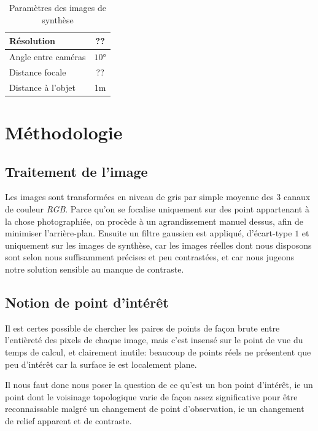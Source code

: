 \documentclass[
	a4paper, %
	10pt, %
	unnumberedsections, %
	twoside, %
]{LTJournalArticle}
\begin{document}
\begin{table}[t]
	\begin{adjustbox}{width=\columnwidth, left}
		\begin{tabular}{l c}
			\hline
			Résolution 	 & ?? \\
			\hline
			Angle entre caméras         & $10$°        \\
			Distance focale         & ??                   \\
			Distance à l'objet  & 1m \\
			\hline
		\end{tabular}
	\end{adjustbox}
	\label{table:params_syn_imgs}
	\caption{Paramètres des images de synthèse}
\end{table}

\section{Méthodologie}

\subsection{Traitement de l'image}
Les images sont transformées en niveau de gris par simple moyenne des $3$ canaux de couleur \textit{RGB}.
Parce qu'on se focalise uniquement sur des point appartenant à la chose photographiée, on procède
à un agrandissement manuel dessus, afin de minimiser l'arrière-plan. Ensuite un filtre gaussien est
appliqué, d'écart-type $1$ et uniquement sur les images de synthèse, car les images réelles
dont nous disposons sont selon nous suffisamment précises et peu contrastées,
et car nous jugeons notre solution sensible au manque de contraste.

\subsection{Notion de point d'intérêt}

Il est certes possible de chercher les paires de points de façon brute entre
l'entièreté des pixels de chaque image, mais c'est insensé sur le
point de vue du temps de calcul, et clairement inutile: beaucoup de
points réels ne présentent que peu d'intérêt car la surface ie est
localement plane.

Il nous faut donc nous poser la question de ce qu'est un bon point
d'intérêt, ie un point dont le voisinage topologique varie de façon
assez significative pour être reconnaissable malgré un changement de
point d'observation, ie un changement de relief apparent et de contraste.
\end{document}
